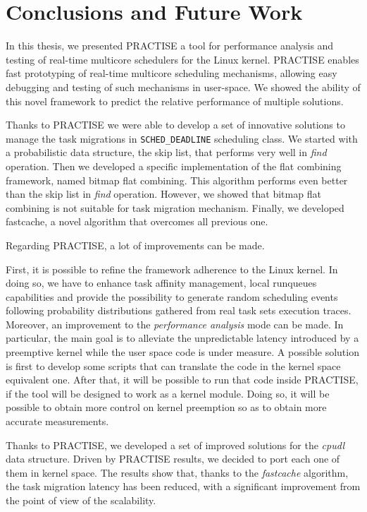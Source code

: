 \chapter{Conclusions and Future Work}\label{chap:conclusions}

In this thesis, we presented PRACTISE a tool for performance analysis and
testing of real-time multicore schedulers for the Linux kernel.
PRACTISE enables fast prototyping of real-time multicore scheduling
mechanisms, allowing easy debugging and testing of such mechanisms in
user-space.
We showed the ability of this novel framework to predict the relative 
performance of multiple solutions.

Thanks to PRACTISE we were able to develop a set of innovative solutions
to manage the task migrations in \texttt{SCHED\_DEADLINE} scheduling class.
We started with a probabilistic data structure, the skip list, that performs
very well in \emph{find} operation. Then we developed a specific implementation
of the flat combining framework, named bitmap flat combining. This algorithm
performs even better than the skip list in \emph{find} operation. However,
we showed that bitmap flat combining is not suitable for task migration mechanism.
Finally, we developed fastcache, a novel algorithm that overcomes all previous
one.

Regarding PRACTISE, a lot of improvements can be made.

First, it is possible to refine the framework adherence to the Linux kernel.
In doing so, we have to enhance task affinity management, local runqueues
capabilities and provide the possibility to generate random scheduling events
following probability distributions gathered from real task sets execution
traces. Moreover, an improvement to the \emph{performance analysis} mode can be
made. In particular, the main goal
is to alleviate the unpredictable latency introduced by a preemptive kernel
while the user space code is under measure. A possible solution
is first to develop some scripts that can translate the code in the
kernel space equivalent one. After that, it will be possible to run that
code inside PRACTISE, if the tool will be designed to work as a kernel
module. Doing so, it will be possible to obtain more control on kernel
preemption so as to obtain more accurate measurements.

Thanks to PRACTISE, we developed a set of improved solutions for the
\emph{cpudl} data structure. Driven by PRACTISE results, we decided
to port each one of them in kernel space. The results show that, thanks to
the \emph{fastcache} algorithm, the task migration latency
has been reduced, with a significant improvement from the point of view
of the scalability.

